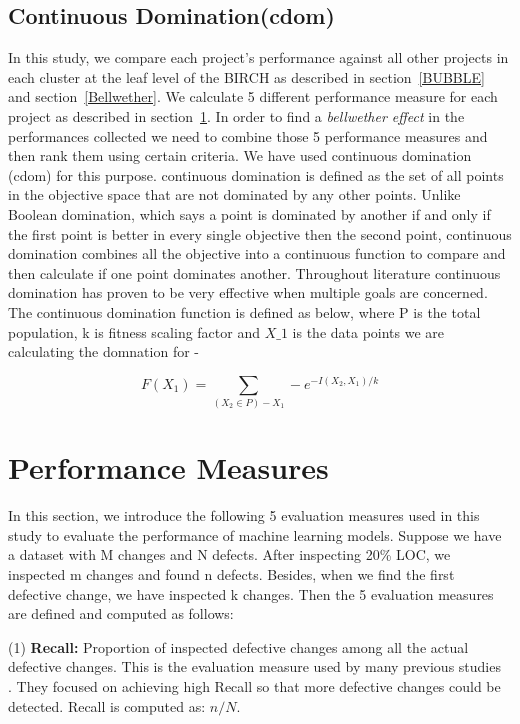 \documentclass[sigconf]{acmart}
\theoremstyle{break}
\begin{document}
\subsection{Continuous Domination(cdom)}
\label{cdom}
In this study, we compare each project's performance against all other projects in each cluster at the leaf level of the BIRCH as described in section~\ref{BUBBLE} and section~\ref{Bellwether}. We calculate 5 different performance measure for each project as described in section~\ref{sec:Measures}. In order to find a \textit{bellwether effect} in the performances collected we need to combine those 5 performance measures and then rank them using certain criteria. We have used continuous domination (cdom) for this purpose. continuous domination is defined as the set of all points in the objective space that are not dominated by any other points. Unlike Boolean domination, which says a point is dominated by another if and only if the first point is better in every single objective then the second point, continuous domination combines all the objective into a continuous function to compare and then calculate if one point dominates another. Throughout literature continuous domination has proven to be very effective when multiple goals are concerned. The continuous domination function is defined as below, where P is the total population, k is fitness scaling factor and $X\_1$ is the data points we are calculating the domnation for - 

\begin{equation}
    F(X_1) = \sum_{{(X_2\in P) - X_1}} -e^{-I(X_2,X_1)/k}
\end{equation}


\section{Performance Measures}
\label{sec:Measures}

In this section, we introduce the following 5 evaluation measures used in this study to evaluate the performance of machine learning models. Suppose we have a dataset with M changes and N defects. After inspecting 20\% LOC, we inspected m changes and found n defects. Besides, when we find the first defective change, we have inspected k changes. Then the 5 evaluation measures are defined and computed as follows:

(1) \textbf{Recall:} Proportion of inspected defective changes among all the actual defective changes. This is the evaluation measure used by many previous studies~\cite{kamei2012large,yang2016effort,yang2017tlel,xia2016collective,yang2015deep} . They focused on achieving high Recall so that more defective changes could be detected. Recall is computed as: $n/N$.
\end{document}
